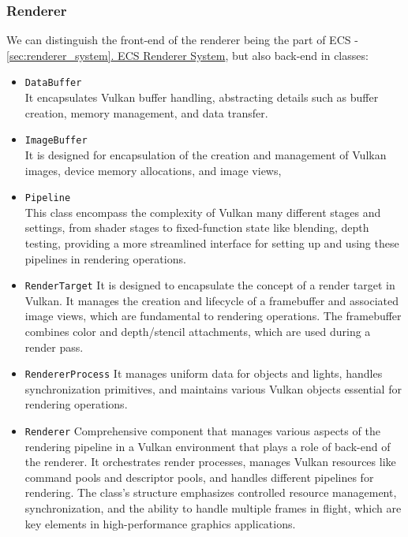 \subsubsection{Renderer}
\label{sec:renderer}
We can distinguish the front-end of the renderer being the part of ECS - \hyperref[sec:renderer_system]{\ref*{sec:renderer_system}. ECS Renderer System}, but also back-end in classes:
\begin{itemize}
    \item \texttt{DataBuffer}\\
    It encapsulates Vulkan buffer handling, abstracting details such as buffer creation, memory management, and data transfer.
    \item \texttt{ImageBuffer}\\
    It is designed for encapsulation of the creation and management of Vulkan images, device memory allocations, and image views,
    \item \texttt{Pipeline}\\
    This class encompass the complexity of Vulkan many different stages and settings, from shader stages to fixed-function state like blending, depth testing, providing a more streamlined interface for setting up and using these pipelines in rendering operations. 
    \item \texttt{RenderTarget}
    It is designed to encapsulate the concept of a render target in Vulkan. It manages the creation and lifecycle of a framebuffer and associated image views, which are fundamental to rendering operations. The framebuffer combines color and depth/stencil attachments, which are used during a render pass. 
    \item \texttt{RendererProcess}
    It manages uniform data for objects and lights, handles synchronization primitives, and maintains various Vulkan objects essential for rendering operations.
    \item \texttt{Renderer}
    Comprehensive component that manages various aspects of the rendering pipeline in a Vulkan environment that plays a role of back-end of the renderer. It orchestrates render processes, manages Vulkan resources like command pools and descriptor pools, and handles different pipelines for rendering. The class's structure emphasizes controlled resource management, synchronization, and the ability to handle multiple frames in flight, which are key elements in high-performance graphics applications.
\end{itemize}